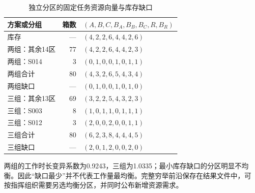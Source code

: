\begin{table}[H]\centering\small\caption{独立分区的固定任务资源向量与库存缺口}\label{tab:q4}
\begin{tabular}{lrl}\toprule
方案或分组 & 箱数 & $(A,B,C,B_A,B_B,B_C,R,B_R)$\\\midrule
库存 & --- & $(4,2,2,6,4,4,2,6)$\\
两组：其余14区 & 77 & $(4,2,2,6,4,4,2,3)$\\
两组：S014 & 3 & $(0,1,0,0,1,0,1,1)$\\
两组合计 & 80 & $(4,3,2,6,5,4,3,4)$\\
两组缺口 & --- & $(0,1,0,0,1,0,1,0)$\\\midrule
三组：其余13区 & 69 & $(3,2,2,5,4,3,2,3)$\\
三组：S003 & 8 & $(1,0,1,1,0,1,1,1)$\\
三组：S012 & 3 & $(2,0,0,2,0,0,1,1)$\\
三组合计 & 80 & $(6,2,3,8,4,4,4,5)$\\
三组缺口 & --- & $(2,0,1,2,0,0,2,0)$\\\bottomrule
\end{tabular}\end{table}

两组的工作时长变异系数为0.9243，三组为1.0335；最小库存缺口的分区明显不均衡。因此“缺口最少”并不代表工作量最均衡。完整穷举前沿保存在结果文件中，可按指挥组织需要另选均衡分区，并同时公布新增资源需求。


